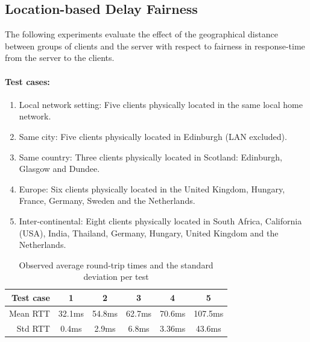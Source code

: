 \documentclass[bsc, 12pt, twoside, singlespacing, parskip, abbrevs, notimes, normalheadings, logo, deptreport]{styles/infthesis}
\begin{document}
\subsection{Location-based Delay Fairness}
The following experiments evaluate the effect of the geographical distance between groups of clients and the server with respect to fairness in response-time from the server to the clients.

\paragraph*{Test cases:}
\begin{enumerate}
\item Local network setting: Five clients physically located in the same local home network.

\item Same city: Five clients physically located in Edinburgh (LAN excluded).

\item Same country: Three clients physically located in Scotland: Edinburgh, Glasgow and Dundee.

\item Europe: Six clients physically located in the United Kingdom, Hungary, France, Germany, Sweden and the Netherlands.

\item Inter-continental: Eight clients physically located in South Africa, California (USA), India, Thailand, Germany, Hungary, United Kingdom and the Netherlands.
\end{enumerate}

\begin{table}[H]
\centering
  \begin{tabular}{ | r || c | c | c | c | c |}
    \hline
    Test case 		& 1 		& 2 		& 3 		& 4 		& 5 		\\ \hline\hline
    Mean RTT 		& 32.1ms 	& 54.8ms 	& 62.7ms 	& 70.6ms 	& 107.5ms	\\ \hline
    Std RTT			& 0.4ms		& 2.9ms		& 6.8ms		& 3.36ms	& 43.6ms	\\ \hline
  \end{tabular}
  \caption{Observed average round-trip times and the standard deviation per test}
  \label{table:geo_avg_roundtrip}
\end{table}
\end{document}
